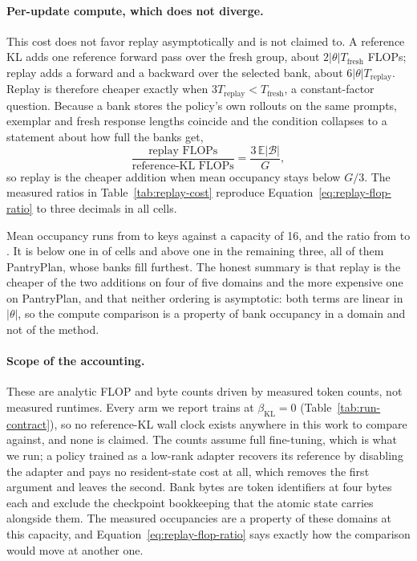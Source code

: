 \documentclass{article}
\newcommand{\1}{\mathbf 1}
\newcommand{\E}{\mathbb E}
\theoremstyle{remark}
\theoremstyle{definition}
\theoremstyle{plain}
\begin{document}
\paragraph{Per-update compute, which does not diverge.}
This cost does not favor replay asymptotically and is not claimed to. A
reference KL adds one reference forward pass over the fresh group, about
$2|\theta|T_{\mathrm{fresh}}$ FLOPs; replay adds a forward and a backward over
the selected bank, about $6|\theta|T_{\mathrm{replay}}$. Replay is therefore
cheaper exactly when $3T_{\mathrm{replay}}<T_{\mathrm{fresh}}$, a
constant-factor question. Because a bank stores the policy's own rollouts on
the same prompts, exemplar and fresh response lengths coincide and the
condition collapses to a statement about how full the banks get,
\begin{equation}
  \frac{\text{replay FLOPs}}{\text{reference-KL FLOPs}}
  =\frac{3\,\E|\mathcal B|}{G},
  \label{eq:replay-flop-ratio}
\end{equation}
so replay is the cheaper addition when mean occupancy stays below $G/3$. The
measured ratios in Table~\ref{tab:replay-cost} reproduce
Equation~\eqref{eq:replay-flop-ratio} to three decimals in all
\MDcostCellsTotal{} cells.

Mean occupancy runs from \MDcostOccMin{} to \MDcostOccMax{} keys against a
capacity of 16, and the ratio from \MDcostRatioMin{} to \MDcostRatioMax{}.
It is below one in \MDcostCellsBelow{} of \MDcostCellsTotal{} cells and above
one in the remaining three, all of them PantryPlan, whose banks fill furthest.
The honest summary is that replay is the cheaper of the two additions on four
of five domains and the more expensive one on PantryPlan, and that neither
ordering is asymptotic: both terms are linear in $|\theta|$, so the compute
comparison is a property of bank occupancy in a domain and not of the method.

\paragraph{Scope of the accounting.}
These are analytic FLOP and byte counts driven by measured token counts, not
measured runtimes. Every arm we report trains at $\beta_{\mathrm{KL}}=0$
(Table~\ref{tab:run-contract}), so no reference-KL wall clock exists anywhere
in this work to compare against, and none is claimed. The counts assume full
fine-tuning, which is what we run; a policy trained as a low-rank adapter
recovers its reference by disabling the adapter and pays no resident-state cost
at all, which removes the first argument and leaves the second. Bank bytes are
token identifiers at four bytes each and exclude the checkpoint bookkeeping
that the atomic state carries alongside them. The measured occupancies are a
property of these domains at this capacity, and
Equation~\eqref{eq:replay-flop-ratio} says exactly how the comparison would
move at another one.
\end{document}
